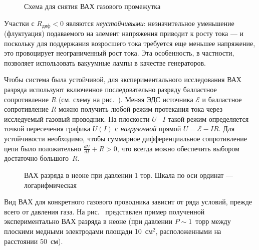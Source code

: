 \begin{wrapfigure}{o}{0.4\textwidth}
    \centering
    \caption{Схема для снятия ВАХ газового промежутка}
\end{wrapfigure}

Участки с $R_{диф} < 0$ являются \emph{неустойчивыми}: незначительное
уменьшение (флуктуация) подаваемого на элемент напряжения приводит 
к росту тока --- и поскольку для поддержания возросшего тока требуется еще меньшее
напряжение, это провоцирует неограниченный рост тока.
Эта особенность, в частности, позволяет использовать вакуумные лампы
в качестве генераторов. 


Чтобы система была устойчивой, для экспериментального исследования ВАХ разряда 
используют включенное последовательно разряду балластное сопротивление $R$
(см. схему на рис.~).
Меняя ЭДС источника $\mathcal{E}$ и балластное сопротивление $R$
можно получить любой режим протекания тока через 
исследуемый газовый проводник.
На плоскости $U$\,--\,$I$ такой режим определяется точкой пересечения 
графика $U(I)$ с \emph{нагрузочной} прямой $U=\mathcal{E}-IR$.
Для устойчивости необходимо, 
чтобы суммарное дифференциальное сопротивление цепи было положительно 
$\frac{dU}{dI} + R >0$, что
всегда можно обеспечить выбором достаточно большого~$R$.






\begin{figure}[h!]
    \centering
    \caption{ВАХ разряда в неоне при давлении 1 тор. 
        Шкала по оси ординат --- логарифмическая}
\end{figure}

Вид ВАХ для конкретного газового проводника зависит от ряда условий, прежде
всего от давления газа. На рис.~ представлен пример
полученной экспериментально ВАХ разряда в неоне (при давлении $P\sim 1$~торр
между плоскими медными электродами площади 10~см$^2$, расположенными на
расстоянии 50~см).

